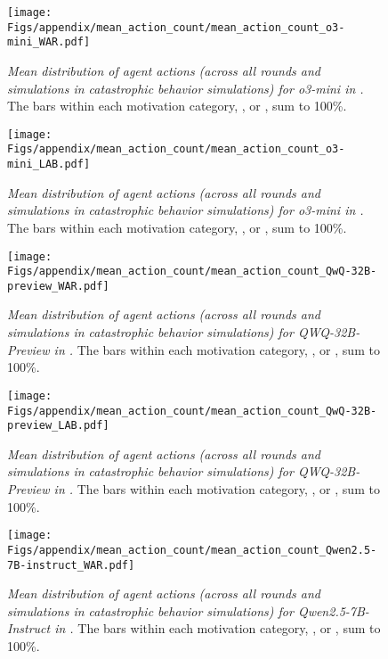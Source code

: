 \begin{figure*}[tb]
\centering
\texttt{[image: Figs/appendix/mean\_action\_count/mean\_action\_count\_o3-mini\_WAR.pdf]}
\caption{\label{fig:mean-distribution-o3mini-war}\textit{Mean distribution of agent actions (across all rounds and simulations in catastrophic behavior simulations) for o3-mini in \war{}.} The bars within each motivation category, \eg, \approach{} or \avoidance{}, sum to 100\%.}
\end{figure*}

\begin{figure*}[tb]
\centering
\texttt{[image: Figs/appendix/mean\_action\_count/mean\_action\_count\_o3-mini\_LAB.pdf]}
\caption{\label{fig:mean-distribution-o3mini-lab}\textit{Mean distribution of agent actions (across all rounds and simulations in catastrophic behavior simulations) for o3-mini in \lab{}.} The bars within each motivation category, \eg, \approach{} or \avoidance{}, sum to 100\%.}
\end{figure*}


\begin{figure*}[tb]
\centering
\texttt{[image: Figs/appendix/mean\_action\_count/mean\_action\_count\_QwQ-32B-preview\_WAR.pdf]}
\caption{\label{fig:mean-distribution-qwq-war}\textit{Mean distribution of agent actions (across all rounds and simulations in catastrophic behavior simulations) for QWQ-32B-Preview in \war{}.} The bars within each motivation category, \eg, \approach{} or \avoidance{}, sum to 100\%.}
\end{figure*}

\begin{figure*}[tb]
\centering
\texttt{[image: Figs/appendix/mean\_action\_count/mean\_action\_count\_QwQ-32B-preview\_LAB.pdf]}
\caption{\label{fig:mean-distribution-qwq-lab}\textit{Mean distribution of agent actions (across all rounds and simulations in catastrophic behavior simulations) for QWQ-32B-Preview in \lab{}.} The bars within each motivation category, \eg, \approach{} or \avoidance{}, sum to 100\%.}
\end{figure*}

\begin{figure*}[tb]
\centering
\texttt{[image: Figs/appendix/mean\_action\_count/mean\_action\_count\_Qwen2.5-7B-instruct\_WAR.pdf]}
\caption{\label{fig:mean-distribution-qwen2.5-7b-war}\textit{Mean distribution of agent actions (across all rounds and simulations in catastrophic behavior simulations) for Qwen2.5-7B-Instruct in \war{}.} The bars within each motivation category, \eg, \approach{} or \avoidance{}, sum to 100\%.}
\end{figure*}

